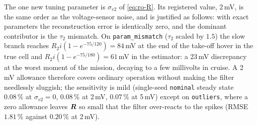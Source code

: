 The one new tuning parameter is $\sigma_{v2}$ of \eqref{eq:ro-R}.  Its registered value, 2\,mV,
is the same order as the voltage-sensor noise, and is justified as follows: with exact parameters
the reconstruction error is identically zero, and the dominant contributor is the $\tau_2$
mismatch.  On \texttt{param\_mismatch} ($\tau_2$ scaled by $1.5$) the slow branch reaches
$R_2 i(1-e^{-75/120})=84$\,mV at the end of the take-off hover in the true cell and
$R_2 i(1-e^{-75/180})=61$\,mV in the estimator: a 23\,mV discrepancy at the worst moment of
the mission, decaying to a few millivolts in cruise.  A 2\,mV allowance therefore covers ordinary
operation without making the filter needlessly sluggish; the sensitivity is mild
(single-seed \texttt{nominal} steady state $0.08\,\%$ at $\sigma_{v2}=0$, $0.08\,\%$ at 2\,mV,
$0.07\,\%$ at 5\,mV) except on \texttt{outliers}, where a zero allowance leaves $\bm{R}$ so small that
the filter over-reacts to the spikes (RMSE $1.81\,\%$ against $0.20\,\%$ at 2\,mV).

